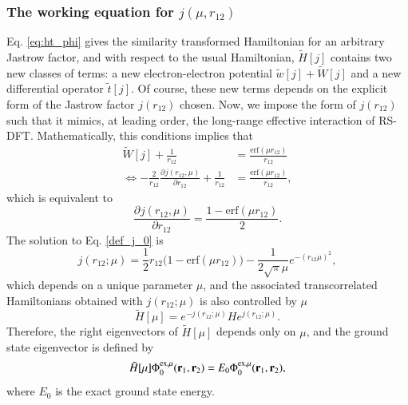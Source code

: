 \documentclass[aip,jcp,reprint,noshowkeys,superscriptaddress]{revtex4-1}
\newcommand{\deriv}[3]{\frac{\partial^{#3} #1}{\partial {#2}^{#3}}}
\newcommand{\br}[0]{{\bf {r}}}
\newcommand{\phimu}[0]{\Phi^{\text{ex},\mu}_0}
\begin{document}
\subsubsection{The working equation for $j(\mu,r_{12})$ }
Eq. \eqref{eq:ht_phi} gives the similarity transformed Hamiltonian for an arbitrary Jastrow factor, 
and with respect to the usual Hamiltonian, $\tilde{H}[j]$ contains two new classes of terms: 
a new electron-electron potential $\tilde{w}[j]+ \tilde{W}[j]$ and a new differential operator  $\tilde{t}[j]$. 
Of course, these new terms depends on the explicit form of the Jastrow factor $j(r_{12})$ chosen. 
Now, we impose the form of $j(r_{12})$ such that it mimics, at leading order, the long-range effective interaction of RS-DFT. 
Mathematically, this conditions implies that 
\begin{equation}
 \begin{aligned}
 \label{def_j_00}
 \tilde{W}[j] + \frac{1}{r_{12}}&= \frac{\text{erf}(\mu r_{12})}{r_{12}} \\ 
\Leftrightarrow -\frac{2}{r_{12}} \deriv{j(r_{12},\mu)}{r_{12}}{} + \frac{1}{r_{12}} & = \frac{\text{erf}(\mu r_{12})}{r_{12}}, 
 \end{aligned}
\end{equation}
which is equivalent to 
\begin{equation}
 \label{def_j_0}
 \deriv{j(r_{12},\mu)}{r_{12}}{} = \frac{1 - \text{erf}(\mu r_{12})}{2}.
\end{equation}
The solution to Eq. \eqref{def_j_0} is 
\begin{equation}
 \label{eq:def_j}
 j(r_{12};\mu) = \frac{1}{2}r_{12}\bigg( 1 - \text{erf}(\mu r_{12})  \bigg) - \frac{1}{2\sqrt{\pi}\mu}e^{-(r_{12}\mu)^2},
\end{equation}
which depends on a unique parameter $\mu$, 
and the associated transcorrelated Hamiltonians obtained with $j(r_{12};\mu)$ is also controlled by $\mu$
\begin{equation}
 \label{eq:def_ht_mu}
 \tilde{H}[\mu] = e^{-j(r_{12};\mu)} H e^{j(r_{12};\mu)}. 
\end{equation}
Therefore, the right eigenvectors of $\tilde{H}[\mu]$ depends only on $\mu$, and the ground state eigenvector is defined by 
\begin{equation}
 \tilde{H}[\mu] \phimu(\br{}_{1},\br{}_{2}) = E_0 \phimu(\br{}_{1},\br{}_{2}), 
\end{equation}
where $E_0$ is the exact ground state energy. 
\end{document}
